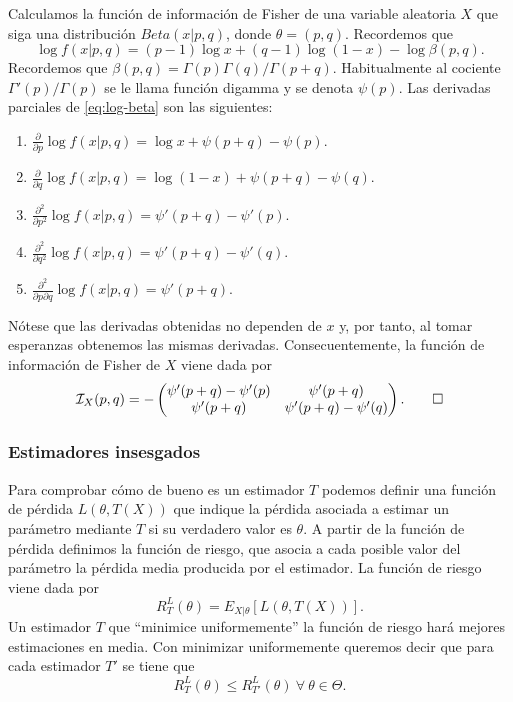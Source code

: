     \begin{ex}
        Calculamos la función de información de Fisher de una variable aleatoria $X$ que siga una distribución $Beta(x | p, q)$, donde $\theta = (p, q)$. Recordemos que
        \begin{equation} \label{eq:log-beta}
            \log f(x | p, q) = (p-1) \log x + (q-1) \log (1-x) - \log \beta(p, q).
        \end{equation}
        Recordemos que $\beta(p,q) = \Gamma(p) \Gamma(q) / \Gamma(p+q)$. Habitualmente al cociente $\Gamma'(p)/\Gamma(p)$ se le llama función digamma y se denota $\psi(p)$. Las derivadas parciales de \eqref{eq:log-beta} son las siguientes:
        \begin{enumerate}
            \item $\frac{\partial}{\partial p} \log f(x | p, q) = \log x + \psi(p+q) - \psi(p).$
            \item $\frac{\partial}{\partial q} \log f(x | p, q) = \log(1-x) + \psi(p+q) - \psi(q).$
            \item $\frac{\partial^2}{\partial p^2} \log f(x | p, q) = \psi'(p+q) - \psi'(p).$
            \item $\frac{\partial^2}{\partial q^2} \log f(x | p, q) = \psi'(p+q) - \psi'(q).$
            \item $\frac{\partial^2}{\partial p\partial q} \log f(x | p, q) = \psi'(p+q).$
        \end{enumerate}

        Nótese que las derivadas obtenidas no dependen de $x$ y, por tanto, al tomar esperanzas obtenemos las mismas derivadas. Consecuentemente, la función de información de Fisher de $X$ viene dada por
        \[\mathcal{I}_X(p, q) = - \left(\begin{matrix} \psi'(p+q) - \psi'(p) & \psi'(p+q) \\ \psi'(p+q) & \psi'(p+q) - \psi'(q) \end{matrix}\right). \qedhere\]

    \end{ex}

    \subsubsection{Estimadores insesgados}

    Para comprobar cómo de bueno es un estimador $T$ podemos definir una función de pérdida $L(\theta,T(X))$ que indique la pérdida asociada a estimar un parámetro mediante $T$ si su verdadero valor es $\theta$. A partir de la función de pérdida definimos la función de riesgo, que asocia a cada posible valor del parámetro la pérdida media producida por el estimador. La función de riesgo viene dada por
    \[ R^L_T(\theta) = E_{X|\theta} [L(\theta,T(X))].\]
    Un estimador $T$ que ``minimice uniformemente'' la función de riesgo hará mejores estimaciones en media. Con minimizar uniformemente queremos decir que para cada estimador $T'$ se tiene que
    \[ R^L_T(\theta) \leq R^L_{T'}(\theta) \ \forall \ \theta \in \Theta.\]

